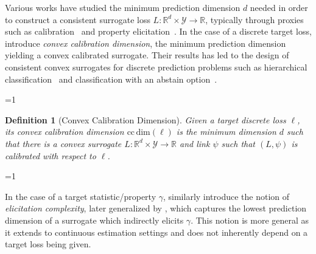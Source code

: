 \documentclass{article}
\newcommand{\Comments}{1}
\newcommand{\mytodo}[2]{\ifnum\Comments=1%
	\todo[linecolor=#1!80!black,backgroundcolor=#1,bordercolor=#1!80!black]{#2}\fi}
\newcommand{\raft}[1]{\mytodo{green!20!white}{RF: #1}}
\newcommand{\jessiet}[1]{\mytodo{purple!20!white}{JF: #1}}
\newcommand{\btw}[1]{\mytodo{gray!10!white}{\textcolor{gray}{BTW: #1}}}%
\newcommand{\reals}{\mathbb{R}}
\newcommand{\ccdim}{\mathrm{cc\,dim}}
\newcommand{\Y}{\mathcal{Y}}
\newtheorem{definition}{Definition}
\begin{document}
Various works have studied the minimum prediction dimension $d$ needed in order to construct a consistent surrogate loss $L: \reals^d \times \Y \to \reals$, typically through proxies such as calibration~\citep{agarwal2015consistent,ramaswamy2016convex} and property elicitation~\citep{frongillo2015vector-valued,fissler2016higher,frongillo2018elicitation}.
In the case of a discrete target loss, \citet{ramaswamy2016convex} introduce \emph{convex calibration dimension}, the minimum prediction dimension yielding a convex calibrated surrogate.
Their results has led to the design of consistent convex surrogates for discrete prediction problems such as hierarchical classification~\citep{ramaswamy2015hierarchical} and classification with an abstain option~\citep{ramaswamy2018consistent}.

\btw{Take out of definition environment?}
\begin{definition}[Convex Calibration Dimension]
	Given a target discrete loss $\ell$, its \emph{convex calibration dimension} $\ccdim(\ell)$ is the minimum dimension $d$ such that there is a convex surrogate \mbox{$L: \reals^d \times \Y \to \reals$} and link $\psi$ such that $(L,\psi)$ is calibrated with respect to $\ell$.
\end{definition}
\btw{Now we'll introduce a different notion, which is related to calibration.}

In the case of a target statistic/property $\gamma$, \citet{lambert2008eliciting} similarly introduce the notion of \emph{elicitation complexity}, later generalized by \citet{frongillo2018elicitation}, which captures the lowest prediction dimension of a surrogate which indirectly elicits $\gamma$.
This notion is more general as it extends to continuous estimation settings and does not inherently depend on a target loss being given. 
\end{document}
